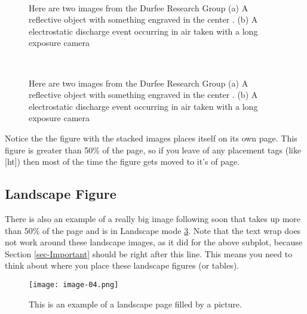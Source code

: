 \begin{figure}
	\centering
	 \\
	\caption{\label{fig:fsm} Here are two images from the Durfee Research Group (a) A reflective object with something engraved in the center \cite{cite-schrama_2019-blue}. (b) A electrostatic discharge event occurring in air taken with a long exposure camera  \cite{cite-schrama_2019}}
\end{figure}

\lipsum[3]

\lipsum[4]

\begin{figure}[ht]
	\centering
	 ~

	\caption{\label{fig:fsm-2} Here are two images from the Durfee Research Group (a) A reflective object with something engraved in the center \cite{cite-schrama_2019-blue}. (b) A electrostatic discharge event occurring in air taken with a long exposure camera  \cite{cite-schrama_2019}}
\end{figure}


Notice the the figure with the stacked images places itself on its own page. This figure is greater than 50\% of the page, so if you leave of any placement tags (like [ht]) then most of the time the figure gets moved to it's of page.

\subsection{Landscape Figure}
There is also an example of a really big image following soon that takes up more than 50\% of the page and is in Landscape mode \ref{fig:hallo}. Note that the text wrap does not work around these landscape images, as it did for the above subplot, because Section \ref{sec-Important} should be right after this line. This means you need to think about where you place these landscape figures (or tables).

\begin{landscape}
	\centering
	\begin{figure}[ht]
		\centering
		\texttt{[image: image-04.png]}
		\caption{This is an example of a landscape page filled by a picture.}
		\label{fig:hallo}
	\end{figure}
\end{landscape}

